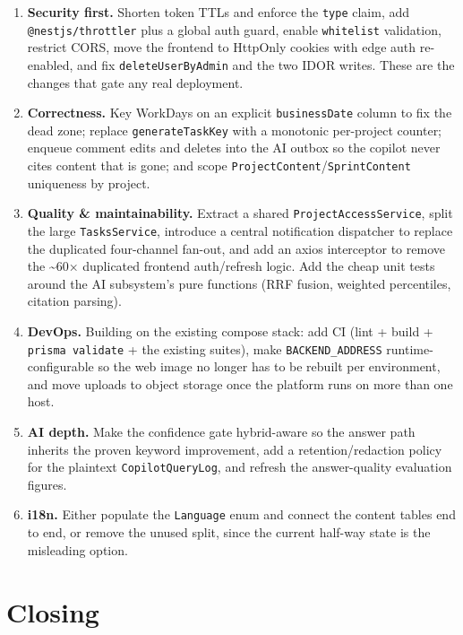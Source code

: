 \begin{enumerate}
  \item \textbf{Security first.} Shorten token TTLs and enforce the \texttt{type} claim, add \texttt{@nestjs/throttler} plus a
   global auth guard, enable \texttt{whitelist} validation, restrict CORS, move the frontend to HttpOnly cookies
   with edge auth re-enabled, and fix \texttt{deleteUserByAdmin} and the two IDOR writes. These are the changes
   that gate any real deployment.
  \item \textbf{Correctness.} Key WorkDays on an explicit \texttt{businessDate} column to fix the dead zone; replace
   \texttt{generateTaskKey} with a monotonic per-project counter; enqueue comment edits and deletes into the AI
   outbox so the copilot never cites content that is gone; and scope \texttt{ProjectContent}/\texttt{SprintContent}
   uniqueness by project.
  \item \textbf{Quality \& maintainability.} Extract a shared \texttt{ProjectAccessService}, split the large \texttt{TasksService},
   introduce a central notification dispatcher to replace the duplicated four-channel fan-out, and add an
   axios interceptor to remove the \textasciitilde60× duplicated frontend auth/refresh logic. Add the cheap unit tests
   around the AI subsystem's pure functions (RRF fusion, weighted percentiles, citation parsing).
  \item \textbf{DevOps.} Building on the existing compose stack: add CI (lint + build +
   \texttt{prisma validate} + the existing suites), make \texttt{BACKEND\_ADDRESS} runtime-configurable
   so the web image no longer has to be rebuilt per environment, and move uploads to object storage
   once the platform runs on more than one host.
  \item \textbf{AI depth.} Make the confidence gate hybrid-aware so the answer path inherits the proven keyword improvement,
   add a retention/redaction policy for the plaintext \texttt{CopilotQueryLog}, and refresh the answer-quality
   evaluation figures.
  \item \textbf{i18n.} Either populate the \texttt{Language} enum and connect the content tables end to end, or remove
   the unused split, since the current half-way state is the misleading option.
\end{enumerate}

\section*{Closing}

